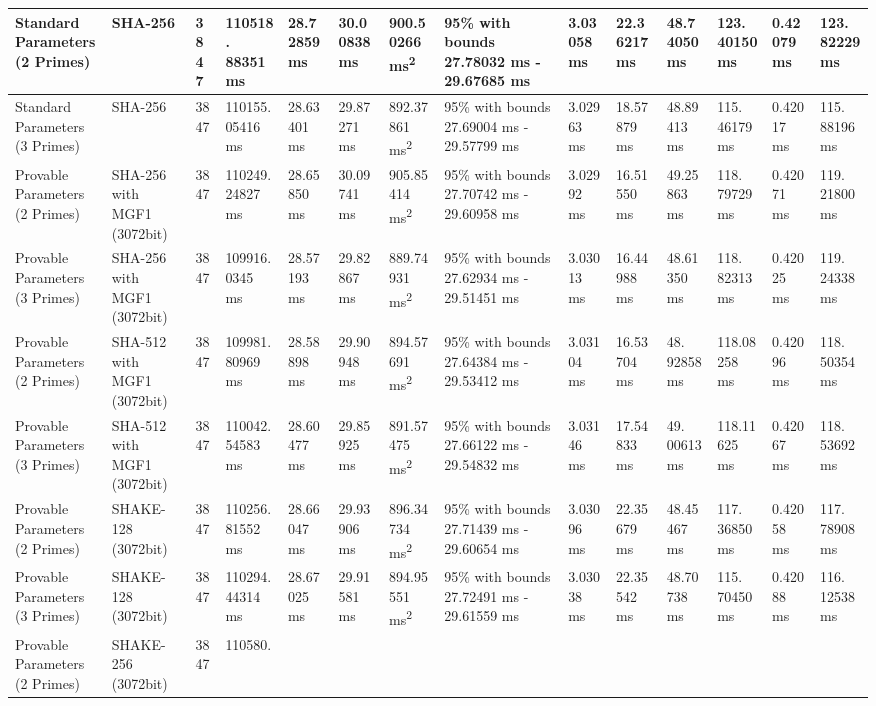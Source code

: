 \documentclass[]{final_report}
\theoremstyle{definition}
\begin{document}
\begin{landscape}
\begin{longtable}{|p{2.3cm}|p{1.8cm}|p{1.0cm}|p{1.7cm}|p{1.4cm}|p{1.5cm}|p{1.8cm}|p{1.5cm}|p{1.2cm}|p{1.5cm}|p{1.3cm}|p{1.2cm}|p{1.3cm}|p{1.3cm}|}
Standard Parameters (2 Primes) & SHA-256 & 3847 & 110518.
88351 ms & 28.72859 ms & 30.00838 ms & 900.50266 ms\textsuperscript{2} & 95\% with bounds 27.78032 ms - 29.67685 ms & 3.03058 ms & 22.36217 ms & 48.74050 ms & 123.
40150 ms & 0.42079 ms & 123.
82229 ms  \\
\hline
Standard Parameters (3 Primes) & SHA-256 & 3847 & 110155.
05416 ms & 28.63401 ms & 29.87271 ms & 892.37861 ms\textsuperscript{2} & 95\% with bounds 27.69004 ms - 29.57799 ms & 3.02963 ms & 18.57879 ms & 48.89413 ms & 115.
46179 ms & 0.42017 ms & 115.
88196 ms  \\
\hline
Provable Parameters (2 Primes) & SHA-256 with MGF1 (3072bit) & 3847 & 110249.
24827 ms & 28.65850 ms & 30.09741 ms & 905.85414 ms\textsuperscript{2} & 95\% with bounds 27.70742 ms - 29.60958 ms & 3.02992 ms & 16.51550 ms & 49.25863 ms & 118.
79729 ms & 0.42071 ms & 119.
21800 ms  \\
\hline
Provable Parameters (3 Primes) & SHA-256 with MGF1 (3072bit) & 3847 & 109916.
0345 ms & 28.57193 ms & 29.82867 ms & 889.74931 ms\textsuperscript{2} & 95\% with bounds 27.62934 ms - 29.51451 ms & 3.03013 ms & 16.44988 ms & 48.61350 ms & 118.
82313 ms & 0.42025 ms & 119.
24338 ms  \\
\hline
Provable Parameters (2 Primes) & SHA-512 with MGF1 (3072bit) & 3847 & 109981.
80969 ms & 28.58898 ms & 29.90948 ms & 894.57691 ms\textsuperscript{2} & 95\% with bounds 27.64384 ms - 29.53412 ms & 3.03104 ms & 16.53704 ms & 48.
92858 ms & 118.08258 ms & 0.42096 ms & 118.
50354 ms  \\
\hline
Provable Parameters (3 Primes) & SHA-512 with MGF1 (3072bit) & 3847 & 110042.
54583 ms & 28.60477 ms & 29.85925 ms & 891.57475 ms\textsuperscript{2} & 95\% with bounds 27.66122 ms - 29.54832 ms & 3.03146 ms & 17.54833 ms & 49.
00613 ms & 118.11625 ms & 0.42067 ms & 118.
53692 ms  \\
\hline
Provable Parameters (2 Primes) & SHAKE-128 (3072bit) & 3847 & 110256.81552 ms & 28.66047 ms & 29.93906 ms & 896.34734 ms\textsuperscript{2} & 95\% with bounds 27.71439 ms - 29.60654 ms & 3.03096 ms & 22.35679 ms & 48.45467 ms & 117.
36850 ms & 0.42058 ms & 117.
78908 ms  \\
\hline
Provable Parameters (3 Primes) & SHAKE-128 (3072bit) & 3847 & 110294.44314 ms & 28.67025 ms & 29.91581 ms & 894.95551 ms\textsuperscript{2} & 95\% with bounds 27.72491 ms - 29.61559 ms & 3.03038 ms & 22.35542 ms & 48.70738 ms & 115.
70450 ms & 0.42088 ms & 116.
12538 ms  \\
\hline
Provable Parameters (2 Primes) & SHAKE-256 (3072bit) & 3847 & 110580.

\end{longtable}
\end{landscape}
\end{document}
